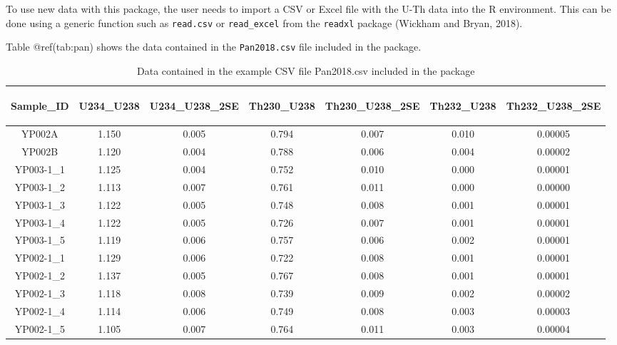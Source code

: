 \documentclass[]{elsarticle} %
\begin{document}
To use new data with this package, the user needs to import a CSV or Excel file with the U-Th data into the R environment. This can be done using a generic function such as \texttt{read.csv} or \texttt{read\_excel} from the \texttt{readxl} package (Wickham and Bryan, 2018).

Table @ref(tab:pan) shows the data contained in the \texttt{Pan2018.csv} file included in the package.

\begin{table}[ht]
\centering
\begin{tabular}{ccccccc}
  \hline
\begin{sideways} Sample\_ID \end{sideways} & \begin{sideways} U234\_U238 \end{sideways} & \begin{sideways} U234\_U238\_2SE \end{sideways} & \begin{sideways} Th230\_U238 \end{sideways} & \begin{sideways} Th230\_U238\_2SE \end{sideways} & \begin{sideways} Th232\_U238 \end{sideways} & \begin{sideways} Th232\_U238\_2SE \end{sideways} \\ 
  \hline
YP002A & 1.150 & 0.005 & 0.794 & 0.007 & 0.010 & 0.00005 \\ 
  YP002B & 1.120 & 0.004 & 0.788 & 0.006 & 0.004 & 0.00002 \\ 
  YP003-1\_1 & 1.125 & 0.004 & 0.752 & 0.010 & 0.000 & 0.00001 \\ 
  YP003-1\_2 & 1.113 & 0.007 & 0.761 & 0.011 & 0.000 & 0.00000 \\ 
  YP003-1\_3 & 1.122 & 0.005 & 0.748 & 0.008 & 0.001 & 0.00001 \\ 
  YP003-1\_4 & 1.122 & 0.005 & 0.726 & 0.007 & 0.001 & 0.00001 \\ 
  YP003-1\_5 & 1.119 & 0.006 & 0.757 & 0.006 & 0.002 & 0.00001 \\ 
  YP002-1\_1 & 1.129 & 0.006 & 0.722 & 0.008 & 0.001 & 0.00001 \\ 
  YP002-1\_2 & 1.137 & 0.005 & 0.767 & 0.008 & 0.001 & 0.00001 \\ 
  YP002-1\_3 & 1.118 & 0.008 & 0.739 & 0.009 & 0.002 & 0.00002 \\ 
  YP002-1\_4 & 1.114 & 0.006 & 0.749 & 0.008 & 0.003 & 0.00003 \\ 
  YP002-1\_5 & 1.105 & 0.007 & 0.764 & 0.011 & 0.003 & 0.00004 \\ 
   \hline
\end{tabular}
\caption{\label{tab:pan}Data contained in the example CSV file Pan2018.csv included in the package} 
\end{table}
\end{document}
